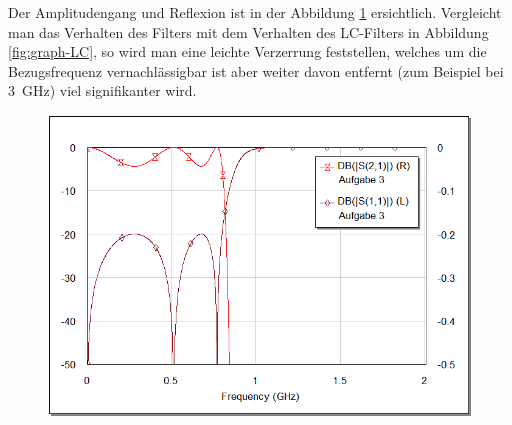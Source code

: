 Der Amplitudengang und Reflexion ist in der Abbildung \ref{fig:graph-richards}
ersichtlich.  Vergleicht  man  das Verhalten des Filters mit dem Verhalten des
LC-Filters  in  Abbildung  \ref{fig:graph-LC},  so   wird   man  eine  leichte
Verzerrung  feststellen,  welches um die Bezugsfrequenz vernachl\"assigbar ist
aber  weiter  davon  entfernt  (zum  Beispiel  bei  \SI{3}{\giga\hertz})  viel
signifikanter wird.

\begin{figure}[h!]
    \centering
    \includegraphics[width=\imagewidth]{images/graph-richards}
    \caption{}
    \label{fig:graph-richards}
\end{figure}

